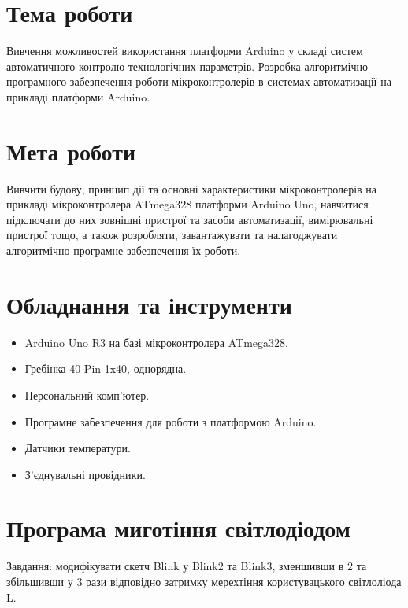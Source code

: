 \documentclass[a4paper]{article}
\begin{document}
\section*{Тема роботи}
Вивчення можливостей використання платформи Arduino у складі систем автоматичного контролю технологічних параметрів. Розробка алгоритмічно-програмного забезпечення роботи мікроконтролерів в системах автоматизації на прикладі платформи Arduino.

\section*{Мета роботи}
Вивчити будову, принцип дії та основні характеристики мікроконтролерів на прикладі мікроконтролера ATmega328 платформи Arduino Uno, навчитися підключати до них зовнішні пристрої та засоби автоматизації, вимірювальні пристрої тощо, а також розробляти, завантажувати та налагоджувати алгоритмічно-програмне забезпечення їх роботи.


\section*{Обладнання та інструменти}
\begin{itemize} 
    \item Arduino Uno R3 на базі мікроконтролера ATmega328.
    \item Гребінка 40 Pin 1x40, однорядна.
    \item Персональний комп’ютер.
    \item Програмне забезпечення для роботи з платформою Arduino.
    \item Датчики температури.
    \item З’єднувальні провідники.
\end{itemize}

\newpage 

\section*{Програма миготіння світлодіодом}

Завдання: модифікувати скетч Blink у Blink2 та
Blink3, зменшивши в 2 та збільшивши у 3 рази відповідно
затримку мерехтіння користувацького світлоліода L.
\end{document}
